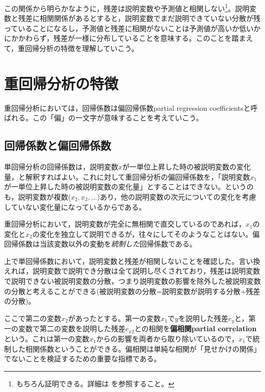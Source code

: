 \documentclass[
  a4paper,
]{ltjsbook}
\begin{document}
この関係から明らかなように，残差は説明変数や予測値と相関しない\footnote{もちろん証明できる。詳細は
  \textcite{kosugi2018} を参照すること。}。説明変数と残差に相関関係があるとすると，説明変数でまだ説明できていない分散が残っていることになるし，予測値と残差に相関がないことは予測値が高いか低いかにかかわらず，残差が一様に分布していることを意味する。このことを踏まえて，重回帰分析の特徴を理解していこう。

\section{重回帰分析の特徴}\label{ux91cdux56deux5e30ux5206ux6790ux306eux7279ux5fb4}

重回帰分析においては，回帰係数は偏回帰係数partial regression
coefficientsと呼ばれる。この「偏」の一文字が意味することを考えていこう。

\subsection{回帰係数と偏回帰係数}\label{ux56deux5e30ux4fc2ux6570ux3068ux504fux56deux5e30ux4fc2ux6570}

単回帰分析の回帰係数は，説明変数\(x\)が一単位上昇した時の被説明変数の変化量，と解釈すればよい。これに対して重回帰分析の偏回帰係数を，「説明変数\(x_1\)が一単位上昇した時の被説明変数の変化量」とすることはできない。というのも，説明変数が複数(\(x_2,x_3,\ldots\))あり，他の説明変数の次元についての変化を考慮していない変化量になっているからである。

重回帰分析において，説明変数が完全に無相関で直交しているのであれば，\(x_1\)の変化と\(x_2\)の変化を独立して説明できるが，往々にしてそのようなことはない。偏回帰係数は当該変数以外の変動を\emph{統制した}回帰係数である。

上で単回帰係数において，説明変数と残差が相関しないことを確認した。言い換えれば，説明変数で説明でき分散は全て説明し尽くされており，残差は説明変数で説明できない被説明変数の分散，つまり説明変数の影響を除外した被説明変数の分散と考えることができる(被説明変数の分散=説明変数が説明する分散+残差の分散)。

ここで第二の変数\(x_2\)があったとする。第一の変数\(x_1\)で\(y\)を説明した残差\(e_y\)と，第一の変数で第二の変数を説明した残差\(e_{x2}\)との相関を\textbf{偏相関partial
correlation}という。これは第一の変数\(x_1\)からの影響を両者から取り除いているので，\(x_1\)で統制した相関係数ということができる。偏相関は単純な相関が「見せかけの関係」でないことを検証するための重要な指標である。
\end{document}
